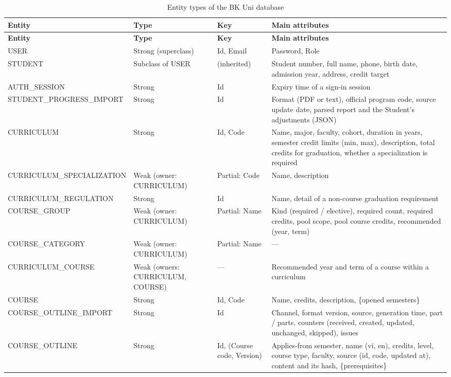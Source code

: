 \begingroup\small
\begin{longtable}{|p{}|p{}|p{}|p{}|}
\caption{Entity types of the BK Uni database}\label{tab:db-entities}\\
\hline
\textbf{Entity} & \textbf{Type} & \textbf{Key} & \textbf{Main attributes} \\
\hline
\endfirsthead
\hline
\textbf{Entity} & \textbf{Type} & \textbf{Key} & \textbf{Main attributes} \\
\hline
\endhead
USER & Strong (superclass) & Id, Email & Password, Role \\
\hline
STUDENT & Subclass of USER & (inherited) & Student number, full name, phone, birth date, admission year, address, credit target \\
\hline
AUTH\_\allowbreak{}SESSION & Strong & Id & Expiry time of a sign-in session \\
\hline
STUDENT\_\allowbreak{}PROGRESS\_\allowbreak{}IMPORT & Strong & Id & Format (PDF or text), official program code, source update date, parsed report and the Student's adjustments (JSON) \\
\hline
CURRICULUM & Strong & Id, Code & Name, major, faculty, cohort, duration in years, semester credit limits (min, max), description, total credits for graduation, whether a specialization is required \\
\hline
CURRICULUM\_\allowbreak{}SPECIALIZATION & Weak (owner: CURRICULUM) & Partial: Code & Name, description \\
\hline
CURRICULUM\_\allowbreak{}REGULATION & Strong & Id & Name, detail of a non-course graduation requirement \\
\hline
COURSE\_\allowbreak{}GROUP & Weak (owner: CURRICULUM) & Partial: Name & Kind (required / elective), required count, required credits, pool scope, pool course credits, recommended (year, term) \\
\hline
COURSE\_\allowbreak{}CATEGORY & Weak (owner: CURRICULUM) & Partial: Name & --- \\
\hline
CURRICULUM\_\allowbreak{}COURSE & Weak (owners: CURRICULUM, COURSE) & --- & Recommended year and term of a course within a curriculum \\
\hline
COURSE & Strong & Id, Code & Name, credits, description, \{opened semesters\} \\
\hline
COURSE\_\allowbreak{}OUTLINE\_\allowbreak{}IMPORT & Strong & Id & Channel, format version, source, generation time, part / parts, counters (received, created, updated, unchanged, skipped), issues \\
\hline
COURSE\_\allowbreak{}OUTLINE & Strong & Id, (Course code, Version) & Applies-from semester, name (vi, en), credits, level, course type, faculty, source (id, code, updated at), content and its hash, \{prerequisites\} \\
\hline
\end{longtable}
\endgroup

